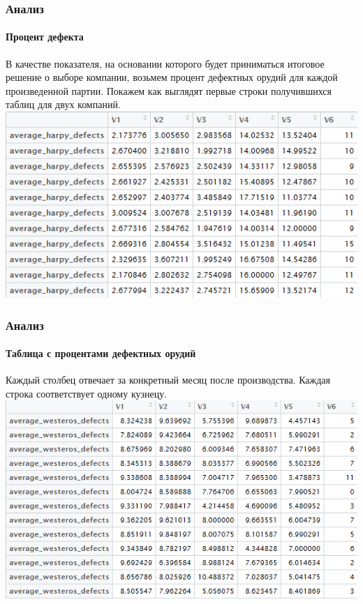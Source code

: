 \documentclass{beamer}
\begin{document}
\begin{frame}
\frametitle{Анализ}
\framesubtitle{Процент дефекта}
\small{В качестве показателя, на основании которого будет приниматься итоговое решение о выборе компании, возьмем процент дефектных орудий для каждой произведенной партии. Покажем как выглядят первые строки получившихся таблиц для двух компаний.}
\includegraphics[width=1\linewidth]{images/image2.png}
\end{frame}

\begin{frame}
\frametitle{Анализ}
\framesubtitle{Таблица с процентами дефектных орудий}
\small{Каждый столбец отвечает за конкретный месяц после производства. Каждая
строка соответствует одному кузнецу.}
\includegraphics[width=1\linewidth]{images/image3.png}
\end{frame}
\end{document}
